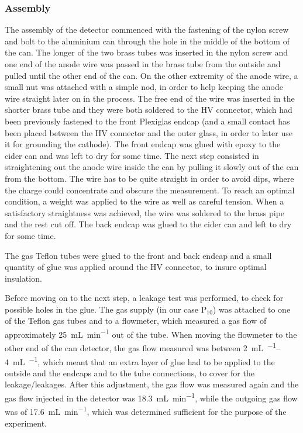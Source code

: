 \subsubsection{Assembly}

The assembly of the detector commenced with the fastening of the nylon screw and
bolt to the aluminium can through the hole in the middle of the bottom of the
can. The longer of the two brass tubes was inserted in the nylon screw and one
end of the anode wire was passed in the brass tube from the outside and pulled
until the other end of the can. On the other extremity of the anode wire, a
small nut was attached with a simple nod, in order to help keeping the anode
wire straight later on in the process. The free end of the wire was inserted in
the shorter brass tube and they were both soldered to the HV connector, which
had been previously fastened to the front Plexiglas endcap (and a small contact
has been placed between the HV connector and the outer glass, in order to later
use it for grounding the cathode). The front endcap was glued with epoxy to the
cider can and was left to dry for some time. The next step consisted in
straightening out the anode wire inside the can by pulling it slowly out of the
can from the bottom. The wire has to be quite straight in order to avoid dips,
where the charge could concentrate and obscure the measurement. To reach an
optimal condition, a weight was applied to the wire as well as careful tension.
When a satisfactory straightness was achieved, the wire was soldered to the
brass pipe and the rest cut off. The back endcap was glued to the cider can and
left to dry for some time.

The gas Teflon tubes were glued to the front and back endcap and a small
quantity of glue was applied around the HV connector, to insure optimal
insulation.

Before moving on to the next step, a leakage test was performed, to check for
possible holes in the glue. The gas supply (in our case $\mathrm{P}_{10}$) was
attached to one of the Teflon gas tubes and to a flowmeter, which measured a gas
flow of approximately \SI{25}{\milli\liter\per\minute} out of the tube. When
moving the flowmeter to the other end of the can detector, the gas flow measured
was between \SIrange{2}{4}{\milli\liter\per\min}, which meant that an extra layer
of glue had to be applied to the outside and the endcaps and to the tube
connections, to cover for the leakage/leakages. After this adjustment, the gas
flow was measured again and the gas flow injected in the detector was
\SI{18.3}{\milli\liter\per\minute}, while the outgoing gas flow was of
\SI{17.6}{\milli\liter\per\minute}, which was determined sufficient for the
purpose of the experiment.

